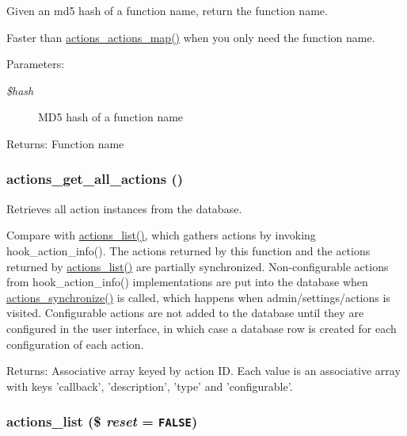 Given an md5 hash of a function name, return the function name.

Faster than \hyperlink{actions_8inc_d943b3f497c80809d895ecc01490d10f}{actions\_\-actions\_\-map()} when you only need the function name.

\begin{Desc}
\item[Parameters:]
\begin{description}
\item[{\em \$hash}]MD5 hash of a function name\end{description}
\end{Desc}
\begin{Desc}
\item[Returns:]Function name \end{Desc}
\hypertarget{actions_8inc_4275e9fee609ba6e85b03278a681436c}{
\subsubsection[{actions\_\-get\_\-all\_\-actions}]{\setlength{\rightskip}{0pt plus 5cm}actions\_\-get\_\-all\_\-actions ()}}
\label{actions_8inc_4275e9fee609ba6e85b03278a681436c}


Retrieves all action instances from the database.

Compare with \hyperlink{actions_8inc_d0dbf276d4ca1834760cffc7e1b1be53}{actions\_\-list()}, which gathers actions by invoking hook\_\-action\_\-info(). The actions returned by this function and the actions returned by \hyperlink{actions_8inc_d0dbf276d4ca1834760cffc7e1b1be53}{actions\_\-list()} are partially synchronized. Non-configurable actions from hook\_\-action\_\-info() implementations are put into the database when \hyperlink{actions_8inc_a4445cbadb5d03206c4a724581b2b30c}{actions\_\-synchronize()} is called, which happens when admin/settings/actions is visited. Configurable actions are not added to the database until they are configured in the user interface, in which case a database row is created for each configuration of each action.

\begin{Desc}
\item[Returns:]Associative array keyed by action ID. Each value is an associative array with keys 'callback', 'description', 'type' and 'configurable'. \end{Desc}
\hypertarget{actions_8inc_d0dbf276d4ca1834760cffc7e1b1be53}{
\subsubsection[{actions\_\-list}]{\setlength{\rightskip}{0pt plus 5cm}actions\_\-list (\$ {\em reset} = {\tt FALSE})}}
\label{actions_8inc_d0dbf276d4ca1834760cffc7e1b1be53}


